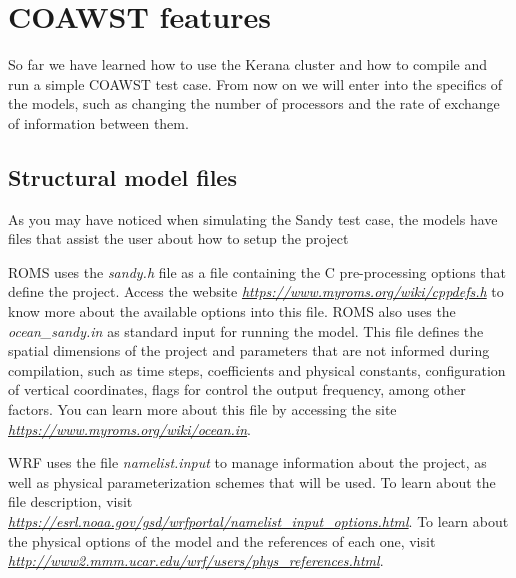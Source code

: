 \chapter{COAWST features}
\bigskip
\noindent So far we have learned how to use the Kerana cluster and how to compile and run a simple COAWST test case.
From now on we will enter into the specifics of the models, such as changing the number of processors
and the rate of exchange of information between them.
\bigskip

\section{Structural model files}
\bigskip

\noindent As you may have noticed when simulating the Sandy test case, the models have files that assist the user about how to setup the project

\bigskip

\noindent ROMS uses the \textit{sandy.h} file as a file containing the C pre-processing options that define the project.
Access the website \textcolor{bleu_cite}{\href{https://www.myroms.org/wiki/cppdefs.h}{\textit{https://www.myroms.org/wiki/cppdefs.h}}} 
to know more about the available options into this file. ROMS also uses the \textit{ocean\_sandy.in} as standard input for
running the model. This file defines the spatial dimensions of the project and parameters that are not informed during compilation,
such as time steps, coefficients and physical constants, configuration of vertical coordinates, flags for
control the output frequency, among other factors. You can learn more about this file by accessing the
site \textcolor{bleu_cite}{\href{https://www.myroms.org/wiki/ocean.in}{\textit{https://www.myroms.org/wiki/ocean.in}}}.
\bigskip

\noindent WRF uses the file \textit{namelist.input} to manage information about the project, as well as
physical parameterization schemes that will be used. To learn about the file description,
visit \textcolor{bleu_cite}{\href{https://esrl.noaa.gov/gsd/wrfportal/namelist\_input\_options.html}{\textit{https://esrl.noaa.gov/gsd/wrfportal/namelist\_input\_options.html}}}.
To learn about the physical options of the model and the references of each one, visit \textcolor{bleu_cite}{\href{http://www2.mmm.ucar.edu/wrf/users/phys\_references.html}{\textit{http://www2.mmm.ucar.edu/wrf/users/phys\_references.html}}}.
\bigskip

